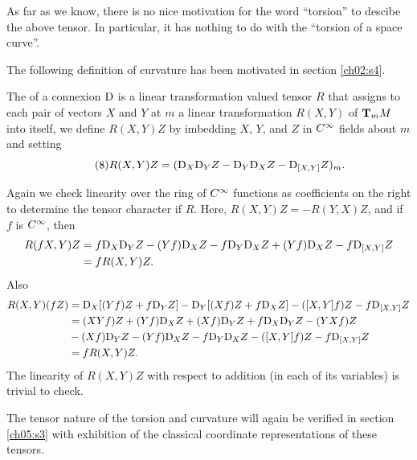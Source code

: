 \documentclass[../main]{subfiles}
\begin{document}
As far as we know, there is no nice motivation for the word ``torsion'' to descibe the above tensor. In particular, it has nothing to do with the ``torsion of a space curve''.

The following definition of curvature has been motivated in section \ref{ch02:s4}.

The  of a connexion $\connection$ is a linear transformation valued tensor $R$ that assigns to each pair of vectors $X$ and $Y$ at $m$ a linear transformation $R(X,Y)$ of $\tangentspace{M}{m}$ into itself, we define $R(X,Y)Z$ by imbedding $X$, $Y$, and $Z$ in $\CInfty$ fields about $m$ and setting
\begin{equation}\label{eq:ch05.8}
\tag{8}
R(X,Y)Z = (\connection_X \connection_Y Z - \connection_Y \connection_X Z - \connection_{[X,Y]} Z)_m.
\end{equation}

Again we check linearity over the ring of $\CInfty$ functions as coefficients on the right to determine the tensor character if $R$. Here, $R(X,Y)Z = -R(Y,X)Z$, and if $f$ is $\CInfty$, then
\begin{align*}
R(fX,Y)Z &= f\connection_X \connection_Y Z - (Yf)\connection_X Z - f \connection_Y \connection_X Z + (Yf)\connection_X Z - f\connection_{[X,Y]}Z \\&= fR(X,Y)Z.    
\end{align*}
Also
\begin{align*}
    R(X,Y)(fZ) &= \connection_X[(Yf)Z + f\connection_Y Z] - \connection_Y[(Xf)Z + f\connection_X Z] - ([X,Y]f)Z - f\connection_{[X,Y]}Z \\
    &= (XYf)Z + (Yf)\connection_X Z + (Xf)\connection_Y Z + f\connection_X \connection_Y Z - (YXf)Z\\ & - (Xf)\connection_Y Z - (Yf)\connection_X Z - f \connection_Y \connection_X Z - ([X,Y]f)Z - f\connection_{[X,Y]} Z \\
    &= fR(X,Y)Z.
\end{align*}
The linearity of $R(X,Y)Z$ with respect to addition (in each of its variables) is trivial to check.

The tensor nature of the torsion and curvature will again be verified in section \ref{ch05:s3} with exhibition of the classical coordinate representations of these tensors.
\end{document}
